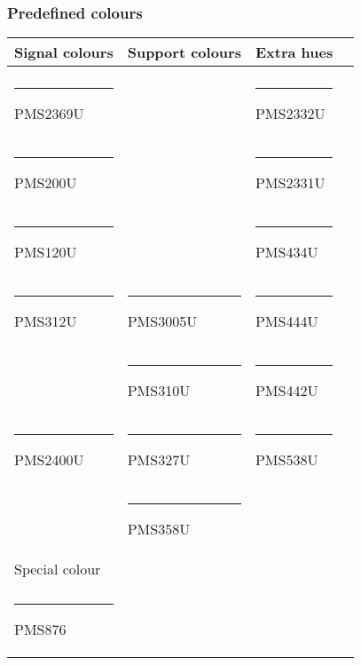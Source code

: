\documentclass[aspectratio=169]{beamer}
\begin{document}
\begin{frame}
\frametitle{Predefined colours}

\centering

\begin{tabular}{llll}
  Signal colours                             & Support colours                            & Extra hues                                 \\
  \hline                                                                                                                               \\
  {\color{PMS2369U}\rule{4em}{2ex}} PMS2369U &                                            & {\color{PMS2332U}\rule{4em}{2ex}} PMS2332U \\
  {\color{PMS200U}\rule{4em}{2ex}} PMS200U   &                                            & {\color{PMS2331U}\rule{4em}{2ex}} PMS2331U \\
  {\color{PMS120U}\rule{4em}{2ex}} PMS120U   &                                            & {\color{PMS434U}\rule{4em}{2ex}} PMS434U   \\
  {\color{PMS312U}\rule{4em}{2ex}} PMS312U   & {\color{PMS3005U}\rule{4em}{2ex}} PMS3005U & {\color{PMS444U}\rule{4em}{2ex}} PMS444U   \\
                                             & {\color{PMS310U}\rule{4em}{2ex}} PMS310U   & {\color{PMS442U}\rule{4em}{2ex}} PMS442U   \\
  {\color{PMS2400U}\rule{4em}{2ex}} PMS2400U & {\color{PMS327U}\rule{4em}{2ex}} PMS327U   & {\color{PMS538U}\rule{4em}{2ex}} PMS538U   \\
                                             & {\color{PMS358U}\rule{4em}{2ex}} PMS358U   &                                            \\
  Special colour                             &                                            &                                            \\
  \hline                                                                                                                               \\
  {\color{PMS876}\rule{4em}{2ex}} PMS876     &                                            &
\end{tabular}

\end{frame}
\end{document}
